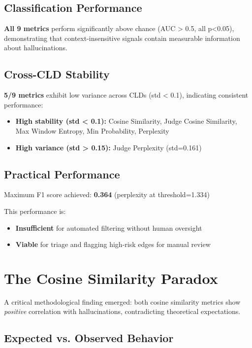 \subsection{Classification Performance}

\textbf{All 9 metrics} perform significantly above chance (AUC > 0.5, all p<0.05), demonstrating that context-insensitive signals contain measurable information about hallucinations.

\subsection{Cross-CLD Stability}

\textbf{5/9 metrics} exhibit low variance across CLDs (std < 0.1), indicating consistent performance:
\begin{itemize}
    \item \textbf{High stability (std < 0.1):} Cosine Similarity, Judge Cosine Similarity, Max Window Entropy, Min Probability, Perplexity
    \item \textbf{High variance (std > 0.15):} Judge Perplexity (std=0.161)
\end{itemize}

\subsection{Practical Performance}

Maximum F1 score achieved: \textbf{0.364} (perplexity at threshold=1.334)

This performance is:
\begin{itemize}
    \item \textbf{Insufficient} for automated filtering without human oversight
    \item \textbf{Viable} for triage and flagging high-risk edges for manual review
\end{itemize}

\section{The Cosine Similarity Paradox}

A critical methodological finding emerged: both cosine similarity metrics show \textit{positive} correlation with hallucinations, contradicting theoretical expectations.

\subsection{Expected vs. Observed Behavior}

